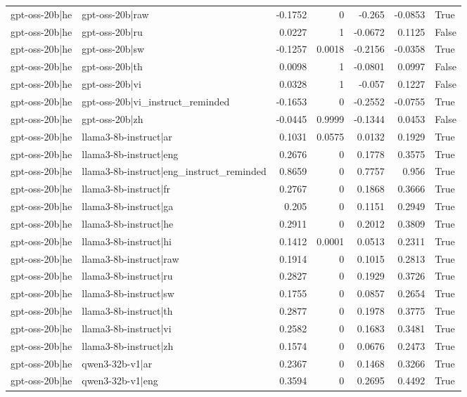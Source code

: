 \begin{table}
\begin{tabular}{l l r r r r l}
gpt-oss-20b|he & gpt-oss-20b|raw & -0.1752 & 0 & -0.265 & -0.0853 & True \\
gpt-oss-20b|he & gpt-oss-20b|ru & 0.0227 & 1 & -0.0672 & 0.1125 & False \\
gpt-oss-20b|he & gpt-oss-20b|sw & -0.1257 & 0.0018 & -0.2156 & -0.0358 & True \\
gpt-oss-20b|he & gpt-oss-20b|th & 0.0098 & 1 & -0.0801 & 0.0997 & False \\
gpt-oss-20b|he & gpt-oss-20b|vi & 0.0328 & 1 & -0.057 & 0.1227 & False \\
gpt-oss-20b|he & gpt-oss-20b|vi_instruct_reminded & -0.1653 & 0 & -0.2552 & -0.0755 & True \\
gpt-oss-20b|he & gpt-oss-20b|zh & -0.0445 & 0.9999 & -0.1344 & 0.0453 & False \\
gpt-oss-20b|he & llama3-8b-instruct|ar & 0.1031 & 0.0575 & 0.0132 & 0.1929 & True \\
gpt-oss-20b|he & llama3-8b-instruct|eng & 0.2676 & 0 & 0.1778 & 0.3575 & True \\
gpt-oss-20b|he & llama3-8b-instruct|eng_instruct_reminded & 0.8659 & 0 & 0.7757 & 0.956 & True \\
gpt-oss-20b|he & llama3-8b-instruct|fr & 0.2767 & 0 & 0.1868 & 0.3666 & True \\
gpt-oss-20b|he & llama3-8b-instruct|ga & 0.205 & 0 & 0.1151 & 0.2949 & True \\
gpt-oss-20b|he & llama3-8b-instruct|he & 0.2911 & 0 & 0.2012 & 0.3809 & True \\
gpt-oss-20b|he & llama3-8b-instruct|hi & 0.1412 & 0.0001 & 0.0513 & 0.2311 & True \\
gpt-oss-20b|he & llama3-8b-instruct|raw & 0.1914 & 0 & 0.1015 & 0.2813 & True \\
gpt-oss-20b|he & llama3-8b-instruct|ru & 0.2827 & 0 & 0.1929 & 0.3726 & True \\
gpt-oss-20b|he & llama3-8b-instruct|sw & 0.1755 & 0 & 0.0857 & 0.2654 & True \\
gpt-oss-20b|he & llama3-8b-instruct|th & 0.2877 & 0 & 0.1978 & 0.3775 & True \\
gpt-oss-20b|he & llama3-8b-instruct|vi & 0.2582 & 0 & 0.1683 & 0.3481 & True \\
gpt-oss-20b|he & llama3-8b-instruct|zh & 0.1574 & 0 & 0.0676 & 0.2473 & True \\
gpt-oss-20b|he & qwen3-32b-v1|ar & 0.2367 & 0 & 0.1468 & 0.3266 & True \\
gpt-oss-20b|he & qwen3-32b-v1|eng & 0.3594 & 0 & 0.2695 & 0.4492 & True \\

\end{tabular}
\end{table}
